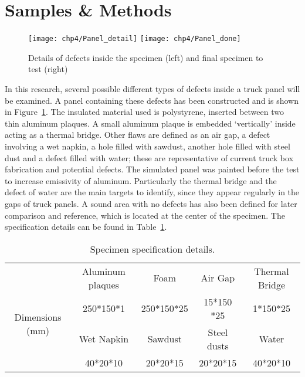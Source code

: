 \section{Samples \& Methods}

\begin{figure}
    \texttt{[image: chp4/Panel\_detail]}
    \texttt{[image: chp4/Panel\_done]}
    \caption{Details of defects inside the specimen (left) and final specimen to test (right) }
    \label{panel}
\end{figure}
\indent \indent In this research, several possible different types of defects inside a truck panel will be examined.  A panel containing these defects has been constructed and is shown in Figure~\ref{panel}. The insulated material used is polystyrene, inserted between two thin aluminum plaques. A small aluminum plaque is embedded ‘vertically’ inside acting as a thermal bridge. Other flaws are defined as an air gap, a defect involving a wet napkin, a hole filled with sawdust, another hole filled with steel dust and a defect filled with water; these are representative of current truck box fabrication and potential defects. The simulated panel was painted before the test to increase emissivity of aluminum. Particularly the thermal bridge and the defect of water are the main targets to identify, since they appear regularly in the gaps of truck panels. A sound area with no defects has also been defined for later comparison and reference, which is located at the center of the specimen. The specification details can be found in Table~\ref{Tab_spe}.
\begin{table}
    \centering
    \scriptsize
    \caption{Specimen specification details.}
    \begin{tabular}{c|c|c|c|c}
        \toprule
        & Aluminum plaques & Foam       & Air Gap     & Thermal Bridge \\ \cline{2-5} 
        \multirow{2}{*}{Dimensions (mm)} & 250*150*1        & 250*150*25 & 15*150 *25  & 1*150*25       \\ \cline{2-5} 
        & Wet Napkin       & Sawdust    & Steel dusts & Water          \\ \cline{2-5} 
        & 40*20*10         & 20*20*15   & 20*20*15    & 40*20*10       \\ \bottomrule
    \end{tabular}
    \label{Tab_spe}
\end{table}
